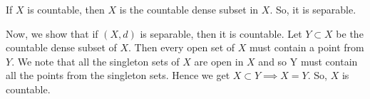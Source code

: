 
\begin{solution}
    If $X$ is countable, then $X$ is the countable
    dense subset in $X$. So, it is separable.

    \vspace*{3mm}
    Now, we show that if $(X,d)$ is separable, then
    it is countable. Let $Y\subset X$ be
    the countable dense subset of $X$.
    Then every open set of $X$ must contain a point
    from $Y$. We note that all the singleton sets of
    $X$ are open in $X$ and so Y must contain all the
    points from the singleton sets. Hence we get
    $X\subset Y\implies X=Y$. So, $X$ is countable.
\end{solution}